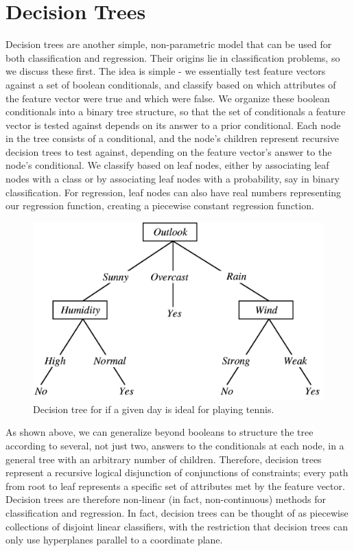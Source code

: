 \documentclass{article}
\begin{document}
\section{Decision Trees}
Decision trees are another simple, non-parametric model that can be used for both classification and regression. Their origins lie in classification problems, so we discuss these first. The idea is simple - we essentially test feature vectors against a set of boolean conditionals, and classify based on which attributes of the feature vector were true and which were false. We organize these boolean conditionals into a binary tree structure, so that the set of conditionals a feature vector is tested against depends on its answer to a prior conditional. Each node in the tree consists of a conditional, and the node's children represent recursive decision trees to test against, depending on the feature vector's answer to the node's conditional. We classify based on leaf nodes, either by associating leaf nodes with a class or by associating leaf nodes with a probability, say in binary classification. For regression, leaf nodes can also have real numbers representing our regression function, creating a piecewise constant regression function.

\begin{figure}[h]
    \center
    \includegraphics{decision_tree.png}
    \caption{Decision tree for if a given day is ideal for playing tennis.}
\end{figure}

As shown above, we can generalize beyond booleans to structure the tree according to several, not just two, answers to the conditionals at each node, in a general tree with an arbitrary number of children. Therefore, decision trees represent a recursive logical disjunction of conjunctions of constraints; every path from root to leaf represents a specific set of attributes met by the feature vector. Decision trees are therefore non-linear (in fact, non-continuous) methods for classification and regression. In fact, decision trees can be thought of as piecewise collections of disjoint linear classifiers, with the restriction that decision trees can only use hyperplanes parallel to a coordinate plane.
\end{document}
